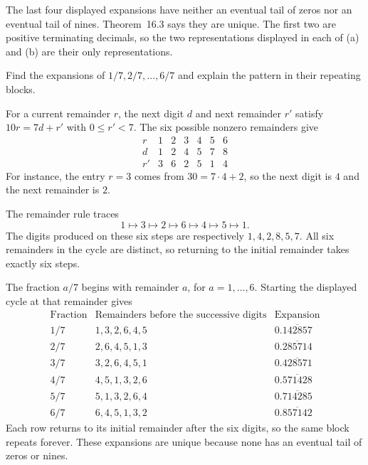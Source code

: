 The last four displayed expansions have neither an eventual tail
of zeros nor an eventual tail of nines. Theorem~16.3 says they
are unique. The first two are positive terminating decimals, so
the two representations displayed in each of (a) and (b) are
their only representations.

\goal Find the expansions of $1/7,2/7,\ldots,6/7$ and explain
the pattern in their repeating blocks.

For a current remainder $r$, the next digit $d$ and next remainder
$r'$ satisfy $10r=7d+r'$ with $0\le r'<7$.
The six possible nonzero remainders give
\[
\begin{array}{c|rrrrrr}
 r&1&2&3&4&5&6\\ \hline
 d&1&2&4&5&7&8\\
 r'&3&6&2&5&1&4
\end{array}
\]
For instance, the entry $r=3$ comes from $30=7\cdot4+2$,
so the next digit is $4$ and the next remainder is $2$.

The remainder rule traces
\[
 1\longmapsto3\longmapsto2\longmapsto6
 \longmapsto4\longmapsto5\longmapsto1.
\]
The digits produced on these six steps are respectively
$1,4,2,8,5,7$. All six remainders in the cycle are distinct,
so returning to the initial remainder takes exactly six steps.

The fraction $a/7$ begins with remainder $a$, for $a=1,\ldots,6$.
Starting the displayed cycle at that remainder gives
\[
 \begin{array}{c|c|c}
 \text{Fraction}&\text{Remainders before the successive digits}
                &\text{Expansion}\\ \hline
 1/7&1,3,2,6,4,5&0.\overline{142857}\\
 2/7&2,6,4,5,1,3&0.\overline{285714}\\
 3/7&3,2,6,4,5,1&0.\overline{428571}\\
 4/7&4,5,1,3,2,6&0.\overline{571428}\\
 5/7&5,1,3,2,6,4&0.\overline{714285}\\
 6/7&6,4,5,1,3,2&0.\overline{857142}
 \end{array}
\]
Each row returns to its initial remainder after the six digits,
so the same block repeats forever. These expansions are unique
because none has an eventual tail of zeros or nines.

